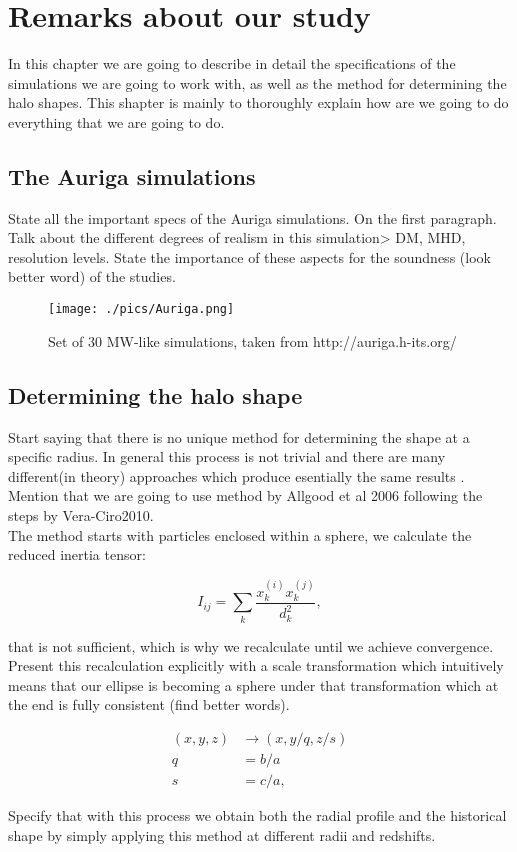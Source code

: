 \chapter{Remarks about our study}
In this chapter we are going to describe in detail the specifications of the simulations we are going to work with, as well as the method for determining the halo shapes. This shapter is mainly to thoroughly explain how are we going to do everything that we are going to do.\\

\section{The Auriga simulations}
State all the important specs of the Auriga simulations. On the first paragraph.\\

Talk about the different degrees of realism in this simulation> DM, MHD, resolution levels. State the importance of these aspects for the soundness (look better word) of the studies.\\

\begin{figure}[!ht]
    \centering
    \texttt{[image: ./pics/Auriga.png]}
    \caption{Set of 30 MW-like simulations, taken from http://auriga.h-its.org/}
    \label{fig:auriga}
\end{figure}

\section{Determining the halo shape}
Start saying that there is no unique method for determining the shape at a specific radius. In general this process is not trivial and there are many different(in theory) approaches which produce esentially the same results \cite{Vera-Ciro2010}. Mention that we are going to use method by Allgood et al 2006 \cite{AllGood2006} following the steps by Vera-Ciro2010.\\

The method starts with particles enclosed within a sphere, we calculate the reduced inertia tensor:

\begin{equation}
I_{ij} = \sum_k \frac{x_k^{(i)}x_k^{(j)}}{d^2_k},
\label{eq:inertia}
\end{equation}

that is not sufficient, which is why we recalculate until we achieve convergence. Present this recalculation explicitly with a scale transformation which intuitively means that our ellipse is becoming a sphere under that transformation which at the end is fully consistent (find better words).

\begin{align}
(x,y,z) &\rightarrow (x,y/q,z/s) \label{eq:scale}\\
q &=  b/a \nonumber \\
s &= c/a \nonumber ,
\end{align}

Specify that with this process we obtain both the radial profile and the historical shape by simply applying this method at different radii and redshifts.
